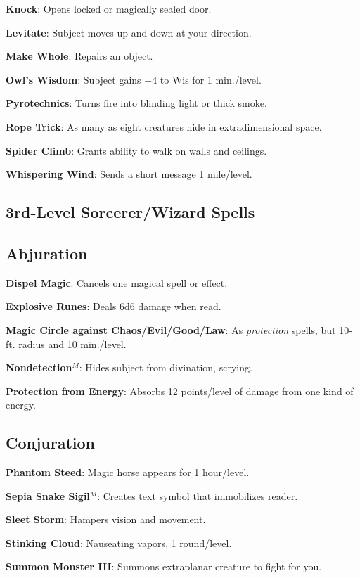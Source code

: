 \textbf{Knock}: Opens locked or magically sealed door.

\textbf{Levitate}: Subject moves up and down at your direction.

\textbf{Make Whole}: Repairs an object.

\textbf{Owl's Wisdom}: Subject gains +4 to Wis for 1 min./level.

\textbf{Pyrotechnics}: Turns fire into blinding light or thick smoke.

\textbf{Rope Trick}: As many as eight creatures hide in extradimensional space.

\textbf{Spider Climb}: Grants ability to walk on walls and ceilings.

\textbf{Whispering Wind}: Sends a short message 1 mile/level.

\subsection{3rd-Level Sorcerer/Wizard Spells}


\subsection{Abjuration}


\textbf{Dispel Magic}: Cancels one magical spell or effect.

\textbf{Explosive Runes}: Deals 6d6 damage when read.

\textbf{Magic Circle against Chaos/Evil/Good/Law}: As \textit{protection }spells, but 10-ft. radius and 10 min./level.

\textbf{Nondetection}\(^{M}\): Hides subject from divination, scrying.

\textbf{Protection from Energy}: Absorbs 12 points/level of damage from one kind of energy.

\subsection{Conjuration}


\textbf{Phantom Steed}: Magic horse appears for 1 hour/level.

\textbf{Sepia Snake Sigil}\(^{M}\): Creates text symbol that immobilizes reader.

\textbf{Sleet Storm}: Hampers vision and movement.

\textbf{Stinking Cloud}: Nauseating vapors, 1 round/level.

\textbf{Summon Monster III}: Summons extraplanar creature to fight for you.

